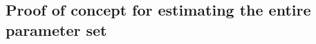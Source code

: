 \documentclass{article}
\begin{document}
\subsection{Proof of concept for estimating the entire parameter set}
\end{document}
